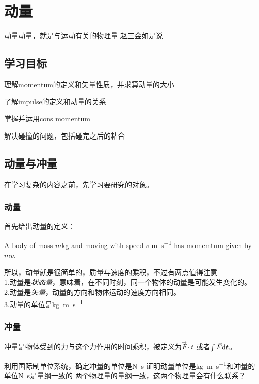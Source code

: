 \chapter{动量}
\label{ch:Momentum}

动量动量，就是与运动有关的物理量
\makebox{}\hfill 赵三金如是说

\section*{学习目标}
\begin{todolist}
	\item 理解\gls{momentum}的定义和矢量性质，并求算动量的大小
	\item 了解\gls{impulse}的定义和动量的关系
	\item 掌握并运用\gls{cons momentum}
	\item 解决碰撞的问题，包括碰完之后的粘合
\end{todolist}
\clearpage


\section{动量与冲量}
\label{sec:Momentum and Impulse}
在学习复杂的内容之前，先学习要研究的对象。

\subsection*{动量}
\label{subsec:Momentum}
首先给出动量的定义：
\begin{definition}
A body of mass $m$\si{\kg} and moving with speed $v$ \si{\m\per\s} has momemtum given by $mv$.
\end{definition}

所以，动量就是很简单的，质量与速度的乘积，不过有两点值得注意\\
1.动量是\emph{状态量}，意味着，在不同时刻，同一个物体的动量是可能发生变化的。\\
2.动量是\emph{矢量}，动量的方向和物体运动的速度方向相同。\\
3.动量的单位是\si{\kg\m\per\s}

\subsection*{冲量}
冲量是物体受到的力与这个力作用的时间乘积，被定义为$\vec{F} \cdot t$ 或者$\int \vec{F} {\mathrm{d}} t$。 

\begin{TaskBox}
利用国际制单位系统，确定冲量的单位是\si{\N \s}
\tcblower
证明动量单位是\si{\kg\m\per\s}和冲量的单位\si{\N \s}是量纲一致的
\tcblower
两个物理量的量纲一致，这两个物理量会有什么联系？
\end{TaskBox}

